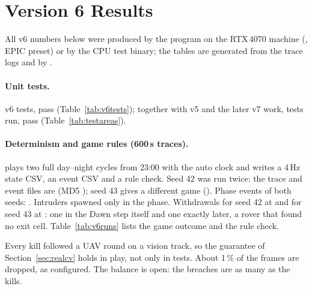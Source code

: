 \section{Version 6 Results}\label{sec:v6results}
All v6 numbers below were produced by the program on the RTX\,4070 machine (\runGpu, EPIC preset) or by the CPU test binary; the tables are generated from the trace logs and  by .

\paragraph{Unit tests.} \nVsixTests{} v6 tests, \nVsixPass{} pass (Table~\ref{tab:v6tests}); together with v5 and the later v7 work, \nTests{} tests run, \nPass{} pass (Table~\ref{tab:testareas}).
\begin{table}[h]
\centering\small
\caption{v6 tests by work package (generated).}\label{tab:v6tests}
\tabVsixTests
\end{table}

\paragraph{Determinism and game rules (600\,s traces).}  plays two full day--night cycles from 23:00 with the auto clock and writes a 4\,Hz state CSV, an event CSV and a rule check. Seed 42 was run twice: the trace and event files are \runSame{} (MD5 \runMdA{}); seed 43 gives a different game (\runMdC{}). Phase events of both seeds: \runPhaseEvents. Intruders spawned only in the \runSpawnPhases{} phase. Withdrawals for seed 42 at \runWithdrawA{} and for seed 43 at \runWithdrawC: one in the Dawn step itself and one exactly  later, a rover that found no exit cell. Table~\ref{tab:v6runs} lists the game outcome and the rule check.
\begin{table}[h]
\centering\scriptsize\setlength{\tabcolsep}{3.5pt}
\caption{600\,s traces, two cycles each. $^*$Rule violations: spawns by day / kills without a UAV round blast / rounds without a confirmed vision track (computed by  from the event stream).}\label{tab:v6runs}
\tabRuns
\end{table}
Every kill followed a UAV round on a vision track, so the guarantee of Section~\ref{sec:realcv} holds in play, not only in tests. About 1\,\% of the frames are dropped, as configured. The balance is open: the breaches are as many as the kills.

